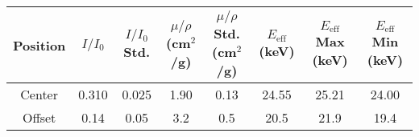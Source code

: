 \begin{tabularx}{1.15\textwidth}{CCCCCCCC}
    \toprule
    Position & $I/I_0$ &  $I/I_0$ Std. &  $\mu/\rho$ (cm$^2$/g) &  $\mu/\rho$ Std. (cm$^2$/g) &  $E_{\text{eff}}$ (keV) &  $E_{\text{eff}}$ Max (keV) &  $E_{\text{eff}}$ Min (keV) \\
    \midrule
    Center   &  0.310   &   0.025       &   1.90                &   0.13                        &   24.55                &  25.21                       &   24.00 \\
    Offset   &  0.14    &   0.05        &   3.2                 &   0.5                         &   20.5                 &  21.9                        &   19.4  \\
    \bottomrule
\end{tabularx}               